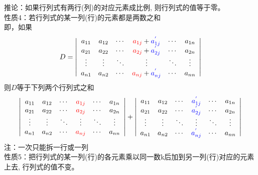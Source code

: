 {\color{blue}推论：}如果行列式有两行(列)的对应元素成比例, 则行列式的值等于零。\\
{\color{blue}性质4：}若行列式的某一列(行)的元素都是两数之和\\
即，如果
$$
D=\left|
\begin{array}{cccccc}
    a_{11} & a_{12} & \cdots & {\color{red} a_{1j}}+{\color{blue} a^{'}_{1j}} & \cdots & a_{1n}\\
    a_{21} & a_{22} & \cdots & {\color{red} a_{2j}}+{\color{blue} a^{'}_{2j}} & \cdots & a_{2n}\\
    \vdots & \vdots & \ddots & \vdots            & \ddots & \vdots \\
    a_{n1} & a_{n2} & \cdots & {\color{red} a_{nj}}+{\color{blue} a^{'}_{nj}} & \cdots & a_{nn}\\
\end{array}\right|
$$
则$D$等于下列两个行列式之和
$$
\left|
\begin{array}{cccccc}
    a_{11} & a_{12} & \cdots & {\color{red} a_{1j}} & \cdots & a_{1n}\\
    a_{21} & a_{22} & \cdots & {\color{red} a_{2j}} & \cdots & a_{2n}\\
    \vdots & \vdots & \ddots & \vdots            & \ddots & \vdots \\
    a_{n1} & a_{n2} & \cdots & {\color{red} a_{nj}} & \cdots & a_{nn}\\
\end{array}\right|
+\left|
\begin{array}{cccccc}
    a_{11} & a_{12} & \cdots & {\color{blue} a^{'}_{1j}} & \cdots & a_{1n}\\
    a_{21} & a_{22} & \cdots & {\color{blue} a^{'}_{2j}} & \cdots & a_{2n}\\
    \vdots & \vdots & \ddots & \vdots            & \ddots & \vdots \\
    a_{n1} & a_{n2} & \cdots & {\color{blue} a^{'}_{nj}} & \cdots & a_{nn}\\
\end{array}\right|
$$
{\color{red}注：}一次只能拆{\color{red}一行}或{\color{red}一列} \\
{\color{blue}性质5：}把行列式的某一列(行)的各元素乘以同一数k后加到另一列(行)对应的元素上去, 行列式的值不变。\\
